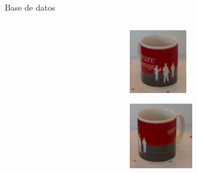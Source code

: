 \documentclass[]{beamer}
\begin{document}
\begin{frame}{Base de datos}
\begin{columns}[t]
\begin{column}{5cm}
        \end{column}
        \begin{column}{5cm}
            \begin{figure}
            	\centering
            	\begin{subfigure}{1.2cm}
            		\includegraphics[width=\textwidth]{img/base/1.png}
            	\end{subfigure}
            	\begin{subfigure}{1.2cm}
            		\includegraphics[width=\textwidth]{img/base/2.png}

\end{subfigure}
\end{figure}
\end{column}
\end{columns}
\end{frame}
\end{document}
